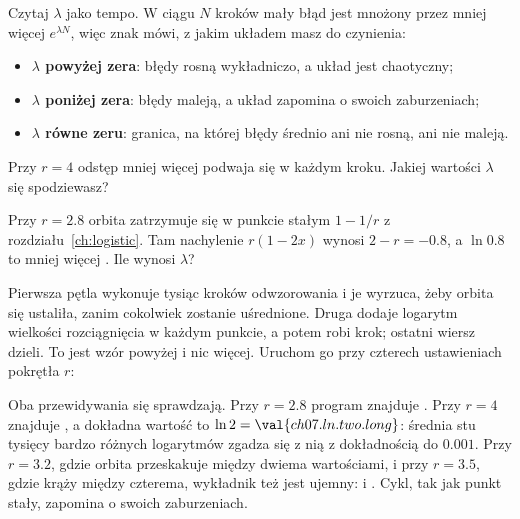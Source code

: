 Czytaj $\lambda$ jako tempo. W ciągu $N$ kroków mały błąd jest mnożony przez
mniej więcej $e^{\lambda N}$, więc znak mówi, z jakim układem masz do
czynienia:

\begin{itemize}
\item \textbf{$\lambda$ powyżej zera}: błędy rosną wykładniczo, a układ jest
  chaotyczny;
\item \textbf{$\lambda$ poniżej zera}: błędy maleją, a układ zapomina o
  swoich zaburzeniach;
\item \textbf{$\lambda$ równe zeru}: granica, na której błędy średnio ani nie
  rosną, ani nie maleją.
\end{itemize}

\begin{think}
Przy $r = 4$ odstęp mniej więcej podwaja się w każdym kroku. Jakiej wartości
$\lambda$ się spodziewasz?
\end{think}

\begin{think}
Przy $r = \num{2.8}$ orbita zatrzymuje się w punkcie stałym $1 - 1/r$ z
rozdziału~\ref{ch:logistic}. Tam nachylenie $r(1 - 2x)$ wynosi
$2 - r = -\num{0.8}$, a $\ln\num{0.8}$ to mniej więcej
. Ile wynosi $\lambda$?
\end{think}


\noindent
Pierwsza pętla wykonuje tysiąc kroków odwzorowania i je wyrzuca, żeby orbita
się ustaliła, zanim cokolwiek zostanie uśrednione. Druga dodaje logarytm
wielkości rozciągnięcia w każdym punkcie, a potem robi krok; ostatni wiersz
dzieli. To jest wzór powyżej i nic więcej. Uruchom go przy czterech
ustawieniach pokrętła $r$:



\noindent
Oba przewidywania się sprawdzają. Przy $r = \num{2.8}$ program znajduje
. Przy $r = 4$ znajduje , a
dokładna wartość to $\ln 2 = \val{ch07.ln.two.long}$: średnia stu tysięcy
bardzo różnych logarytmów zgadza się z nią z dokładnością do $\num{0.001}$.
Przy $r = \num{3.2}$, gdzie orbita przeskakuje między dwiema wartościami, i
przy $r = \num{3.5}$, gdzie krąży między czterema, wykładnik też jest
ujemny:  i . Cykl, tak jak
punkt stały, zapomina o swoich zaburzeniach.

